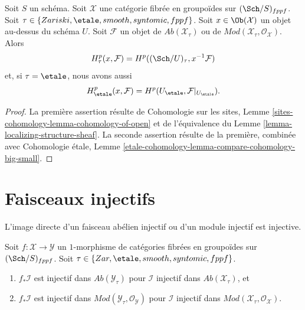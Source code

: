 \begin{lemma}
\label{lemma-cohomology-restriction}
Soit $S$ un schéma. Soit $\mathcal{X}$ une catégorie fibrée en groupoïdes
sur $(\Sch/S)_{fppf}$. Soit $\tau \in \{Zariski, \etale, smooth,
syntomic, fppf\}$. Soit $x \in \Ob(\mathcal{X})$ un objet au-dessus
du schéma $U$. Soit $\mathcal{F}$
un objet de $\textit{Ab}(\mathcal{X}_\tau)$ ou de
$\textit{Mod}(\mathcal{X}_\tau, \mathcal{O}_\mathcal{X})$. Alors
$$
H^p_\tau(x, \mathcal{F}) = H^p((\Sch/U)_\tau, x^{-1}\mathcal{F})
$$
et, si $\tau = \etale$, nous avons aussi
$$
H^p_\etale(x, \mathcal{F}) =
H^p(U_\etale, \mathcal{F}|_{U_\etale}).
$$
\end{lemma}

\begin{proof}
La première assertion résulte de
Cohomologie sur les sites, Lemme \ref{sites-cohomology-lemma-cohomology-of-open}
et de l'équivalence du
Lemme \ref{lemma-localizing-structure-sheaf}.
La seconde assertion résulte de la première, combinée avec
Cohomologie \'etale, Lemme
\ref{etale-cohomology-lemma-compare-cohomology-big-small}.
\end{proof}














\section{Faisceaux injectifs}
\label{section-lower-shriek}

\noindent
L'image directe d'un faisceau abélien injectif ou d'un module injectif est injective.

\begin{lemma}
\label{lemma-pushforward-injective}
Soit $f : \mathcal{X} \to \mathcal{Y}$ un $1$-morphisme de catégories
fibrées en groupoïdes sur $(\Sch/S)_{fppf}$. Soit
$\tau \in \{Zar, \etale, smooth, syntomic, fppf\}$.
\begin{enumerate}
\item $f_*\mathcal{I}$ est injectif dans $\textit{Ab}(\mathcal{Y}_\tau)$
pour $\mathcal{I}$ injectif dans $\textit{Ab}(\mathcal{X}_\tau)$, et
\item $f_*\mathcal{I}$ est injectif dans
$\textit{Mod}(\mathcal{Y}_\tau, \mathcal{O}_\mathcal{Y})$
pour $\mathcal{I}$ injectif dans
$\textit{Mod}(\mathcal{X}_\tau, \mathcal{O}_\mathcal{X})$.
\end{enumerate}
\end{lemma}

